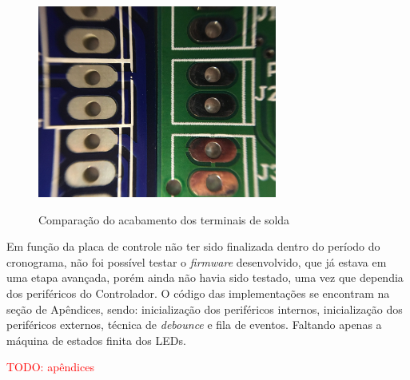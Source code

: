 \begin{figure}[H]
    \centering
    \caption{Comparação do acabamento dos terminais de solda}
    \includegraphics[width=0.7\textwidth]{./dados/figuras/comparacao-pads}
    \label{fig:comparacao-pads}
\end{figure}

Em função da placa de controle não ter sido finalizada dentro do período do cronograma, não foi possível testar o \emph{firmware} desenvolvido, que já estava em uma etapa avançada, porém ainda não havia sido testado, uma vez que dependia dos periféricos do Controlador. O código das implementações se encontram na seção de Apêndices, sendo: inicialização dos periféricos internos, inicialização dos periféricos externos, técnica de \emph{debounce} e fila de eventos. Faltando apenas a máquina de estados finita dos LEDs.

\textcolor{red}{TODO: apêndices}
